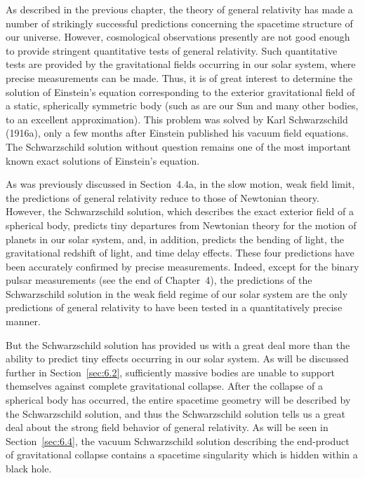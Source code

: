 
As described in the previous chapter, the theory of general relativity has made a
number of strikingly successful predictions concerning the spacetime structure of
our universe. However, cosmological observations presently are not good enough to
provide stringent quantitative tests of general relativity. Such quantitative tests
are provided by the gravitational fields occurring in our solar system, where precise
measurements can be made. Thus, it is of great interest to determine the solution of
Einstein's equation corresponding to the exterior gravitational field of a static,
spherically symmetric body (such as are our Sun and many other bodies, to an
excellent approximation). This problem was solved by Karl Schwarzschild (1916a),
only a few months after Einstein published his vacuum field equations. The
Schwarzschild solution without question remains one of the most important known
exact solutions of Einstein's equation.

As was previously discussed in Section~4.4a, in the slow motion, weak field limit,
the predictions of general relativity reduce to those of Newtonian theory. However,
the Schwarzschild solution, which describes the exact exterior field of a spherical
body, predicts tiny departures from Newtonian theory for the motion of planets in
our solar system, and, in addition, predicts the bending of light, the gravitational
redshift of light, and time delay effects. These four predictions have been accurately
confirmed by precise measurements. Indeed, except for the binary pulsar measurements
(see the end of Chapter~4), the predictions of the Schwarzschild solution in the weak
field regime of our solar system are the only predictions of general relativity to
have been tested in a quantitatively precise manner.

But the Schwarzschild solution has provided us with a great deal more than the
ability to predict tiny effects occurring in our solar system. As will be discussed
further in Section~\ref{sec:6.2}, sufficiently massive bodies are unable to support
themselves against complete gravitational collapse. After the collapse of a spherical
body has occurred, the entire spacetime geometry will be described by the
Schwarzschild solution, and thus the Schwarzschild solution tells us a great deal
about the strong field behavior of general relativity. As will be seen in
Section~\ref{sec:6.4}, the vacuum Schwarzschild solution describing the end-product
of gravitational collapse contains a spacetime singularity which is hidden within a
black hole.

